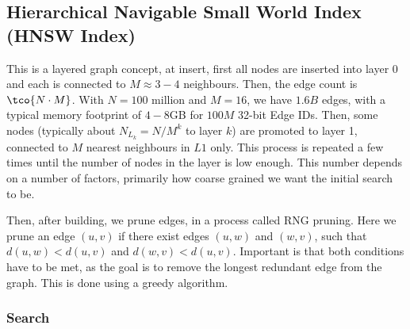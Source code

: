 \subsection{Hierarchical Navigable Small World Index (HNSW Index)}
This is a layered graph concept, at insert, first all nodes are inserted into layer 0 and each is connected to $M \approx 3 - 4$ neighbours.
Then, the edge count is $\tco{N \cdot M}$. With $N = 100$ million and $M = 16$, we have $1.6B$ edges, with a typical memory footprint of $4-8$GB for $100M$ 32-bit Edge IDs.
Then, some nodes (typically about $N_{L_k} = N / M^k$ to layer $k$) are promoted to layer 1, connected to $M$ nearest neighbours in $L1$ only.
This process is repeated a few times until the number of nodes in the layer is low enough.
This number depends on a number of factors, primarily how coarse grained we want the initial search to be.

Then, after building, we prune edges, in a process called RNG pruning.
Here we prune an edge $(u, v)$ if there exist edges $(u, w)$ and $(w, v)$, such that $d(u, w) < d(u, v)$ and $d(w, v) < d(u, v)$.
Important is that both conditions have to be met, as the goal is to remove the longest redundant edge from the graph.
This is done using a greedy algorithm.


\subsubsection{Search}
